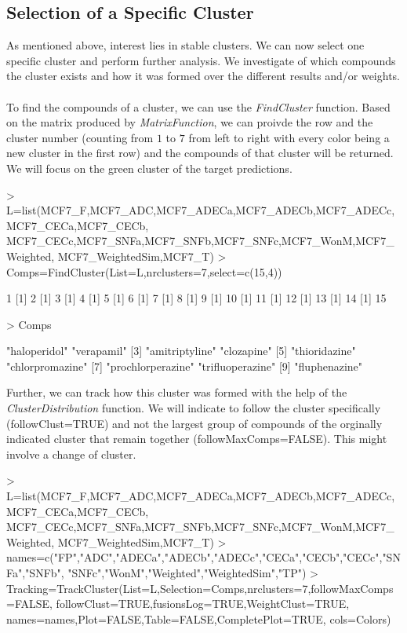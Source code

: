 \documentclass[a4paper]{article}
\begin{document}
\subsection{Selection of a Specific Cluster}
As mentioned above, interest lies in stable clusters. We can now select one
specific cluster and perform further analysis. We investigate of which compounds
the cluster exists and how it was formed over the different results and/or
weights.\\ \\
To find the compounds of a cluster, we can use the {\it FindCluster} function.
Based on the matrix produced by {\it MatrixFunction}, we can proivde the row and
the cluster number (counting from $1$ to $7$ from left to right with every color
being a new cluster in the first row) and the compounds of that cluster will be
returned. We will focus on the green cluster of the target predictions.
\begin{Schunk}
\begin{Sinput}
> L=list(MCF7_F,MCF7_ADC,MCF7_ADECa,MCF7_ADECb,MCF7_ADECc,MCF7_CECa,MCF7_CECb,
        MCF7_CECc,MCF7_SNFa,MCF7_SNFb,MCF7_SNFc,MCF7_WonM,MCF7_Weighted,
        MCF7_WeightedSim,MCF7_T)
> Comps=FindCluster(List=L,nrclusters=7,select=c(15,4))
\end{Sinput}
\begin{Soutput}
[1] 1
[1] 2
[1] 3
[1] 4
[1] 5
[1] 6
[1] 7
[1] 8
[1] 9
[1] 10
[1] 11
[1] 12
[1] 13
[1] 14
[1] 15
\end{Soutput}
\begin{Sinput}
> Comps
\end{Sinput}
\begin{Soutput}
[1] "haloperidol"      "verapamil"       
[3] "amitriptyline"    "clozapine"       
[5] "thioridazine"     "chlorpromazine"  
[7] "prochlorperazine" "trifluoperazine" 
[9] "fluphenazine"    
\end{Soutput}
\end{Schunk}
Further, we can track how this cluster was formed with the help of the {\it
ClusterDistribution} function. We will indicate to follow the cluster
specifically (followClust=TRUE) and not the largest group of compounds of the
orginally indicated cluster that remain together (followMaxComps=FALSE). This
might involve a change of cluster.
\begin{Schunk}
\begin{Sinput}
> L=list(MCF7_F,MCF7_ADC,MCF7_ADECa,MCF7_ADECb,MCF7_ADECc,MCF7_CECa,MCF7_CECb,
 		MCF7_CECc,MCF7_SNFa,MCF7_SNFb,MCF7_SNFc,MCF7_WonM,MCF7_Weighted,
 		MCF7_WeightedSim,MCF7_T)
> names=c("FP","ADC","ADECa","ADECb","ADECc","CECa","CECb","CECc","SNFa","SNFb",
 		"SNFc","WonM","Weighted","WeightedSim","TP")
> Tracking=TrackCluster(List=L,Selection=Comps,nrclusters=7,followMaxComps=FALSE,
 		followClust=TRUE,fusionsLog=TRUE,WeightClust=TRUE,
 		names=names,Plot=FALSE,Table=FALSE,CompletePlot=TRUE,
 		cols=Colors)
\end{Sinput}
\end{Schunk}
\end{document}
